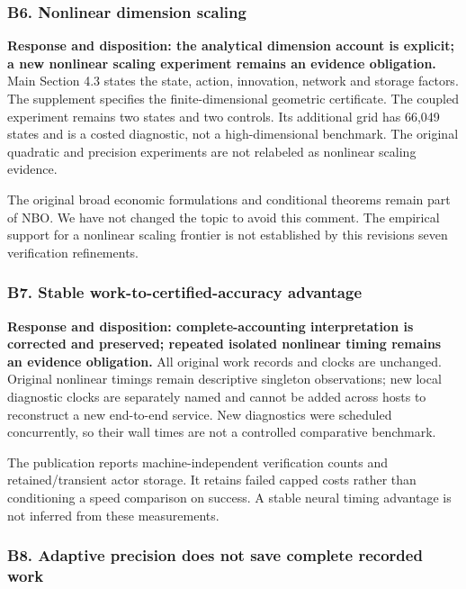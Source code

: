 \documentclass[ecta,nameyear,draft]{econsocart}
\begin{document}
\hypertarget{b6-nonlinear-dimension-scaling}{%
\subsubsection{B6. Nonlinear dimension
scaling}\label{b6-nonlinear-dimension-scaling}}

\textbf{Response and disposition: the analytical dimension account is
explicit; a new nonlinear scaling experiment remains an evidence
obligation.} Main Section 4.3 states the state, action, innovation,
network and storage factors. The supplement specifies the
finite-dimensional geometric certificate. The coupled experiment remains
two states and two controls. Its additional grid has 66,049 states and
is a costed diagnostic, not a high-dimensional benchmark. The original
quadratic and precision experiments are not relabeled as nonlinear
scaling evidence.

The original broad economic formulations and conditional theorems remain
part of NBO. We have not changed the topic to avoid this comment. The
empirical support for a nonlinear scaling frontier is not established by
this revision\textquotesingle s seven verification refinements.

\hypertarget{b7-stable-work-to-certified-accuracy-advantage}{%
\subsubsection{B7. Stable work-to-certified-accuracy
advantage}\label{b7-stable-work-to-certified-accuracy-advantage}}

\textbf{Response and disposition: complete-accounting interpretation is
corrected and preserved; repeated isolated nonlinear timing remains an
evidence obligation.} All original work records and clocks are
unchanged. Original nonlinear timings remain descriptive singleton
observations; new local diagnostic clocks are separately named and
cannot be added across hosts to reconstruct a new end-to-end service.
New diagnostics were scheduled concurrently, so their wall times are not
a controlled comparative benchmark.

The publication reports machine-independent verification counts and
retained/transient actor storage. It retains failed capped costs rather
than conditioning a speed comparison on success. A stable neural timing
advantage is not inferred from these measurements.

\hypertarget{b8-adaptive-precision-does-not-save-complete-recorded-work}{%
\subsubsection{B8. Adaptive precision does not save complete recorded
work}\label{b8-adaptive-precision-does-not-save-complete-recorded-work}}
\end{document}
